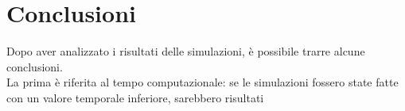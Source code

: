 \section{Conclusioni}
Dopo aver analizzato i risultati delle simulazioni, è possibile trarre alcune conclusioni.\\
La prima è riferita al tempo computazionale: se le simulazioni fossero state fatte con un valore temporale inferiore, sarebbero risultati